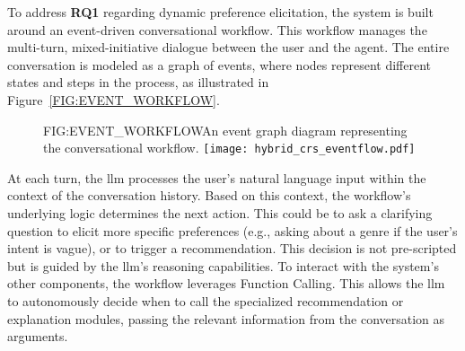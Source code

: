 To address \textbf{RQ1} regarding dynamic preference elicitation, the system is built around an event-driven conversational workflow. This workflow manages the multi-turn, mixed-initiative dialogue between the user and the agent. The entire conversation is modeled as a graph of events, where nodes represent different states and steps in the process, as illustrated in Figure~\ref{FIG:EVENT_WORKFLOW}.

\begin{figure}[Workflow Event Graph]{FIG:EVENT_WORKFLOW}{An event graph diagram representing the conversational workflow.}
    \texttt{[image: hybrid\_crs\_eventflow.pdf]}
\end{figure}

At each turn, the \ac{llm} processes the user's natural language input within the context of the conversation history. Based on this context, the workflow's underlying logic determines the next action. This could be to ask a clarifying question to elicit more specific preferences (e.g., asking about a genre if the user's intent is vague), or to trigger a recommendation. This decision is not pre-scripted but is guided by the \ac{llm}'s reasoning capabilities. To interact with the system's other components, the workflow leverages Function Calling. This allows the \ac{llm} to autonomously decide when to call the specialized recommendation or explanation modules, passing the relevant information from the conversation as arguments.